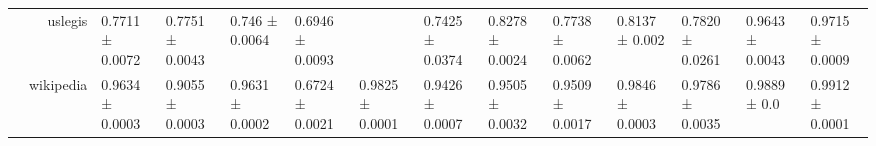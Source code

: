 {\begin{tabular}{@{}crllllllllllll@{}}
                                    & uslegis              & 0.7711 ± 0.0072           & 0.7751 ± 0.0043            & 0.746 ± 0.0064            & 0.6946 ± 0.0093            & \multicolumn{1}{l|}{}                & 0.7425 ± 0.0374           & 0.8278 ± 0.0024           & 0.7738 ± 0.0062          & 0.8137 ± 0.002          & 0.7820 ± 0.0261         & 0.9643 ± 0.0043          & 0.9715 ± 0.0009            \\
                                    & wikipedia            & 0.9634 ± 0.0003           & 0.9055 ± 0.0003            & 0.9631 ± 0.0002           & 0.6724 ± 0.0021            & \multicolumn{1}{l|}{0.9825 ± 0.0001} & 0.9426 ± 0.0007           & 0.9505 ± 0.0032           & 0.9509 ± 0.0017          & 0.9846 ± 0.0003         & 0.9786 ± 0.0035         & 0.9889 ± 0.0             & 0.9912 ± 0.0001            \\ \bottomrule
\end{tabular}%
}